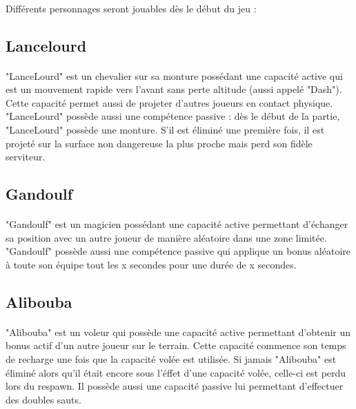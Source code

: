 \documentclass[12pt]{report}
\begin{document}
	\paragraph{}
	
		Différents personnages seront jouables dès le début du jeu : 
	
		\subsection{Lancelourd}
		\paragraph{}
			"LanceLourd" est un chevalier sur sa monture possédant une capacité active qui est un mouvement rapide vers l'avant sans perte altitude (aussi appelé "Dash"). Cette capacité permet aussi de projeter d'autres joueurs en contact physique. "LanceLourd" possède aussi une compétence passive : dès le début de la partie, "LanceLourd" possède une monture. S'il est éliminé une première fois, il est projeté sur la surface non dangereuse la plus proche mais perd son fidèle serviteur.
		
		\subsection{Gandoulf}
		\paragraph{}
			"Gandoulf" est un magicien possédant une capacité active permettant d'échanger sa position avec un autre joueur de manière aléatoire dans une zone limitée. "Gandoulf" possède aussi une compétence passive qui applique un bonus aléatoire à toute son équipe tout les x secondes pour une durée de x secondes.
		
		\subsection{Alibouba}
		\paragraph{}
			"Alibouba" est un voleur qui possède une capacité active permettant d'obtenir un bonus actif d'un autre joueur sur le terrain. Cette capacité commence son temps de recharge une fois que la capacité volée est utilisée. Si jamais "Alibouba" est éliminé alors qu'il était encore sous l'éffet d'une capacité volée, celle-ci est perdu lors du respawn. Il possède aussi une capacité passive lui permettant d'effectuer des doubles sauts.
		
\end{document}
